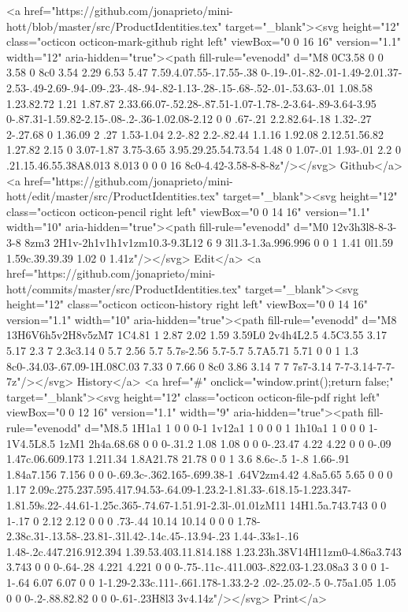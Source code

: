       <a href="https://github.com/jonaprieto/mini-hott/blob/master/src/ProductIdentities.tex" target="_blank"><svg height="12" class="octicon octicon-mark-github right left" viewBox="0 0 16 16" version="1.1" width="12" aria-hidden="true"><path fill-rule="evenodd" d="M8 0C3.58 0 0 3.58 0 8c0 3.54 2.29 6.53 5.47 7.59.4.07.55-.17.55-.38 0-.19-.01-.82-.01-1.49-2.01.37-2.53-.49-2.69-.94-.09-.23-.48-.94-.82-1.13-.28-.15-.68-.52-.01-.53.63-.01 1.08.58 1.23.82.72 1.21 1.87.87 2.33.66.07-.52.28-.87.51-1.07-1.78-.2-3.64-.89-3.64-3.95 0-.87.31-1.59.82-2.15-.08-.2-.36-1.02.08-2.12 0 0 .67-.21 2.2.82.64-.18 1.32-.27 2-.27.68 0 1.36.09 2 .27 1.53-1.04 2.2-.82 2.2-.82.44 1.1.16 1.92.08 2.12.51.56.82 1.27.82 2.15 0 3.07-1.87 3.75-3.65 3.95.29.25.54.73.54 1.48 0 1.07-.01 1.93-.01 2.2 0 .21.15.46.55.38A8.013 8.013 0 0 0 16 8c0-4.42-3.58-8-8-8z"/></svg> Github</a>
      <a href="https://github.com/jonaprieto/mini-hott/edit/master/src/ProductIdentities.tex" target="_blank"><svg height="12" class="octicon octicon-pencil right left" viewBox="0 0 14 16" version="1.1" width="10" aria-hidden="true"><path fill-rule="evenodd" d="M0 12v3h3l8-8-3-3-8 8zm3 2H1v-2h1v1h1v1zm10.3-9.3L12 6 9 3l1.3-1.3a.996.996 0 0 1 1.41 0l1.59 1.59c.39.39.39 1.02 0 1.41z"/></svg> Edit</a>
      <a href="https://github.com/jonaprieto/mini-hott/commits/master/src/ProductIdentities.tex" target="_blank"><svg height="12" class="octicon octicon-history right left" viewBox="0 0 14 16" version="1.1" width="10" aria-hidden="true"><path fill-rule="evenodd" d="M8 13H6V6h5v2H8v5zM7 1C4.81 1 2.87 2.02 1.59 3.59L0 2v4h4L2.5 4.5C3.55 3.17 5.17 2.3 7 2.3c3.14 0 5.7 2.56 5.7 5.7s-2.56 5.7-5.7 5.7A5.71 5.71 0 0 1 1.3 8c0-.34.03-.67.09-1H.08C.03 7.33 0 7.66 0 8c0 3.86 3.14 7 7 7s7-3.14 7-7-3.14-7-7-7z"/></svg> History</a>
      <a  href="#" onclick="window.print();return false;" target="_blank"><svg height="12" class="octicon octicon-file-pdf right left" viewBox="0 0 12 16" version="1.1" width="9" aria-hidden="true"><path fill-rule="evenodd" d="M8.5 1H1a1 1 0 0 0-1 1v12a1 1 0 0 0 1 1h10a1 1 0 0 0 1-1V4.5L8.5 1zM1 2h4a.68.68 0 0 0-.31.2 1.08 1.08 0 0 0-.23.47 4.22 4.22 0 0 0-.09 1.47c.06.609.173 1.211.34 1.8A21.78 21.78 0 0 1 3.6 8.6c-.5 1-.8 1.66-.91 1.84a7.156 7.156 0 0 0-.69.3c-.362.165-.699.38-1 .64V2zm4.42 4.8a5.65 5.65 0 0 0 1.17 2.09c.275.237.595.417.94.53-.64.09-1.23.2-1.81.33-.618.15-1.223.347-1.81.59s.22-.44.61-1.25c.365-.74.67-1.51.91-2.3l-.01.01zM11 14H1.5a.743.743 0 0 1-.17 0 2.12 2.12 0 0 0 .73-.44 10.14 10.14 0 0 0 1.78-2.38c.31-.13.58-.23.81-.31l.42-.14c.45-.13.94-.23 1.44-.33s1-.16 1.48-.2c.447.216.912.394 1.39.53.403.11.814.188 1.23.23h.38V14H11zm0-4.86a3.743 3.743 0 0 0-.64-.28 4.221 4.221 0 0 0-.75-.11c-.411.003-.822.03-1.23.08a3 3 0 0 1-1-.64 6.07 6.07 0 0 1-1.29-2.33c.111-.661.178-1.33.2-2 .02-.25.02-.5 0-.75a1.05 1.05 0 0 0-.2-.88.82.82 0 0 0-.61-.23H8l3 3v4.14z"/></svg> Print</a>
